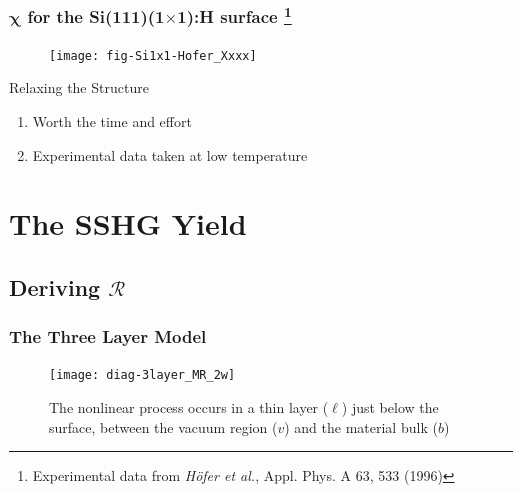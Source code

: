 \documentclass{beamer}
\begin{document}
\begin{frame}
\frametitle{$\boldsymbol{\chi}$ for the Si(111)(1$\times$1):H surface%
\footnote{Experimental data from \emph{H\"ofer et al.}, 
Appl. Phys. A 63, 533 (1996)}}
\vspace{-0.5cm}
\begin{figure}
\centering
\texttt{[image: fig-Si1x1-Hofer\_Xxxx]}
\end{figure}
\vspace{-0.5cm}
\begin{block}{Relaxing the Structure}
\begin{enumerate}
\item Worth the time and effort
\item Experimental data taken at low temperature
\end{enumerate}
\end{block}
\end{frame}



\section{The SSHG Yield}



\subsection{Deriving \texorpdfstring{$\mathcal{R}$}{R}}

\begin{frame}
\frametitle{The Three Layer Model}
\begin{figure}
\centering
\texttt{[image: diag-3layer\_MR\_2w]}
\caption{The nonlinear process occurs in a thin layer ($\ell$) just below the
surface, between the vacuum region ($v$) and the material bulk ($b$)}
\end{figure}
\end{frame}
\end{document}
